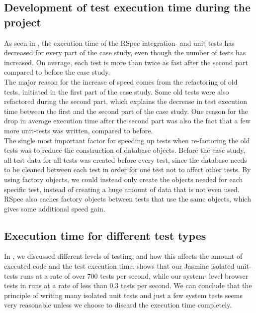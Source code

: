 
\subsection{Development of test execution time during the project}

As seen in , the execution time of the RSpec
integration- and unit tests has decreased for every part of the case
study, even though the number of tests has increased. On average, each
test is more than twice as fast after the second part compared to before
the case study.\\

The major reason for the increase of speed comes from the refactoring of
old tests, initiated in the first part of the case study. Some old tests
were also refactored during the second part, which explains the decrease
in test execution time between the first and the second part of the case
study. One reason for the drop in average execution time after the
second part was also the fact that a few more unit-tests was written,
compared to before.\\

The single most important factor for speeding up tests when re-factoring
the old tests was to reduce the construction of database objects. Before
the case study, all test data for all tests was created before every
test, since the database needs to be cleaned between each test in order
for one test not to affect other tests. By using factory objects, we
could instead only create the objects needed for each specific test,
instead of creating a huge amount of data that is not even used. RSpec
also caches factory objects between tests that use the same objects,
which gives some additional speed gain.\\


\subsection{Execution time for different test types}

In , we discussed different levels of testing,
and how this affects the amount of executed code and the test execution
time.  shows that our Jasmine isolated unit-
tests runs at a rate of over 700 tests per second, while our system-
level browser tests in  runs at a rate of
less than 0.3 tests per second. We can conclude that the principle of
writing many isolated unit tests and just a few system tests seems
very reasonable unless we choose to discard the execution time
completely.\\

